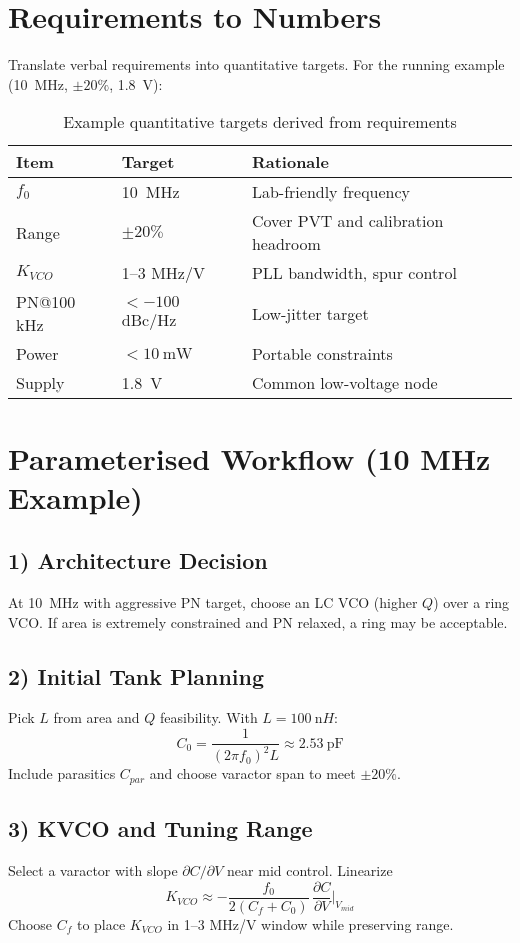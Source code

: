 \section{Requirements to Numbers}
Translate verbal requirements into quantitative targets. For the running example (\SI{10}{\mega\hertz}, $\pm20\%$, \SI{1.8}{\volt}):
\begin{table}[H]
  \centering
  \begin{tabular}{lll}
    \toprule
    Item & Target & Rationale \\
    \midrule
    $f_0$ & \SI{10}{\mega\hertz} & Lab-friendly frequency \\
    Range & $\pm20\%$ & Cover PVT and calibration headroom \\
    $K_{VCO}$ & 1--3 \si{\mega\hertz/\volt} & PLL bandwidth, spur control \\
    PN@100 kHz & $< -100$ dBc/Hz & Low-jitter target \\
    Power & $< \SI{10}{\milli\watt}$ & Portable constraints \\
    Supply & \SI{1.8}{\volt} & Common low-voltage node \\
    \bottomrule
  \end{tabular}
  \caption{Example quantitative targets derived from requirements}
\end{table}

\section{Parameterised Workflow (10 MHz Example)}
\subsection*{1) Architecture Decision}
At \SI{10}{\mega\hertz} with aggressive PN target, choose an LC VCO (higher $Q$) over a ring VCO. If area is extremely constrained and PN relaxed, a ring may be acceptable.

\subsection*{2) Initial Tank Planning}
Pick $L$ from area and $Q$ feasibility. With $L=\SI{100}{\nano H}$:
\[
 C_0 = \frac{1}{(2\pi f_0)^2 L} \approx \SI{2.53}{\pF}
\]
Include parasitics $C_{par}$ and choose varactor span to meet $\pm20\%$.

\subsection*{3) KVCO and Tuning Range}
Select a varactor with slope $\partial C/\partial V$ near mid control. Linearize
\[
 K_{VCO} \approx -\frac{f_0}{2(C_f+C_0)}\,\frac{\partial C}{\partial V}\Big|_{V_{mid}}
\]
Choose $C_f$ to place $K_{VCO}$ in 1--3 \si{\mega Hz/V} window while preserving range.

